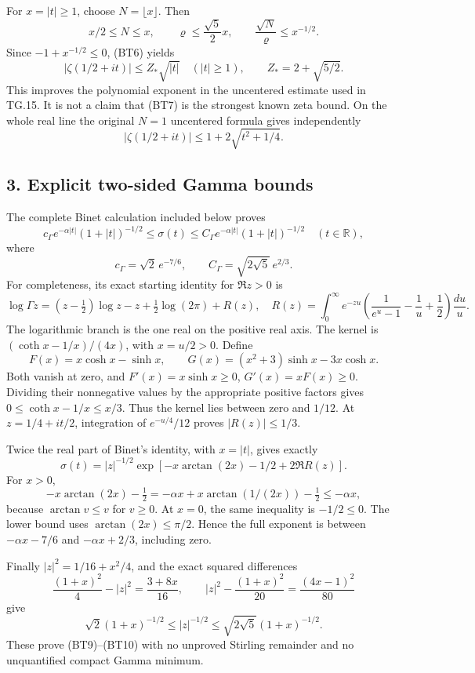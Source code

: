 \documentclass[11pt,a4paper]{article}
\begin{document}
For \(x=|t|\ge1\), choose \(N=\lfloor x\rfloor\). Then \[
x/2\le N\le x,\qquad
\varrho\le\frac{\sqrt5}{2}x,\qquad
\frac{\sqrt N}{\varrho}\le x^{-1/2}.
\] Since \(-1+x^{-1/2}\le0\), (BT6) yields \[
\boxed{|\zeta(1/2+it)|\le Z_*\sqrt{|t|}\quad(|t|\ge1),
\qquad Z_*=2+\sqrt{5/2}.}
\tag{BT7}
\] This improves the polynomial exponent in the uncentered estimate used in TG.15. It is not a claim that (BT7) is the strongest known zeta bound. On the whole real line the original \(N=1\) uncentered formula gives independently \[
|\zeta(1/2+it)|\le 1+2\sqrt{t^2+1/4}.
\tag{BT8}
\]

\subsection{3. Explicit two-sided Gamma bounds}\label{bt:explicit-two-sided-gamma-bounds}

The complete Binet calculation included below proves \[
\boxed{
c_\Gamma e^{-\alpha|t|}(1+|t|)^{-1/2}
\le \sigma(t)\le
C_\Gamma e^{-\alpha|t|}(1+|t|)^{-1/2}
\quad(t\in\mathbb R),}
\tag{BT9}
\] where \[
c_\Gamma=\sqrt2\,e^{-7/6},\qquad
C_\Gamma=\sqrt{2\sqrt5}\,e^{2/3}.
\tag{BT10}
\] For completeness, its exact starting identity for \(\Re z>0\) is \[
\log\Gamma z=(z-\tfrac12)\log z-z+\tfrac12\log(2\pi)+R(z),
\quad
R(z)=\int_0^\infty e^{-zu}
 \left(\frac1{e^u-1}-\frac1u+\frac12\right)\frac{du}{u}.
\] The logarithmic branch is the one real on the positive real axis. The kernel is \((\coth x-1/x)/(4x)\), with \(x=u/2>0\). Define \[
F(x)=x\cosh x-\sinh x,\qquad
G(x)=(x^2+3)\sinh x-3x\cosh x.
\] Both vanish at zero, and \(F'(x)=x\sinh x\ge0\), \(G'(x)=xF(x)\ge0\). Dividing their nonnegative values by the appropriate positive factors gives \(0\le\coth x-1/x\le x/3\). Thus the kernel lies between zero and \(1/12\). At \(z=1/4+it/2\), integration of \(e^{-u/4}/12\) proves \(|R(z)|\le1/3\).

Twice the real part of Binet's identity, with \(x=|t|\), gives exactly \[
\sigma(t)=|z|^{-1/2}
 \exp[-x\arctan(2x)-1/2+2\Re R(z)].
\] For \(x>0\), \[
-x\arctan(2x)-\tfrac12
=-\alpha x+x\arctan(1/(2x))-\tfrac12
\le-\alpha x,
\] because \(\arctan v\le v\) for \(v\ge0\). At \(x=0\), the same inequality is \(-1/2\le0\). The lower bound uses \(\arctan(2x)\le\pi/2\). Hence the full exponent is between \(-\alpha x-7/6\) and \(-\alpha x+2/3\), including zero.

Finally \(|z|^2=1/16+x^2/4\), and the exact squared differences \[
\frac{(1+x)^2}{4}-|z|^2=\frac{3+8x}{16},\qquad
|z|^2-\frac{(1+x)^2}{20}=\frac{(4x-1)^2}{80}
\] give \[
\sqrt2(1+x)^{-1/2}\le |z|^{-1/2}
\le\sqrt{2\sqrt5}(1+x)^{-1/2}.
\] These prove (BT9)--(BT10) with no unproved Stirling remainder and no unquantified compact Gamma minimum.
\end{document}
